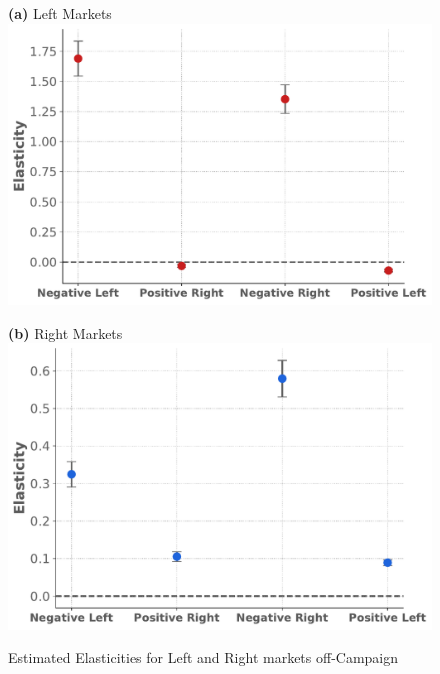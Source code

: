 \documentclass[12pt]{article}
\begin{document}
	
	\begin{figure}[!htbp]
		\centering
		\caption{Estimated Elasticities for Left and Right markets off-Campaign}
		\label{fig:elasticities_pre}
		\vspace{0.5em} %
		
		\begin{minipage}{0.45\textwidth}
			\centering
			\textbf{(a)} Left Markets\\
			\includegraphics[width=\linewidth]{figures/elasticities_left_pre}
		\end{minipage}
		\hfill
		\begin{minipage}{0.45\textwidth}
			\centering
			\vspace{1.5em}
			\textbf{(b)} Right Markets \\
			\includegraphics[width=\linewidth]{figures/elasticities_right_pre}
			\label{fig:2figsA}
		\end{minipage}
		

\end{figure}
\end{document}
